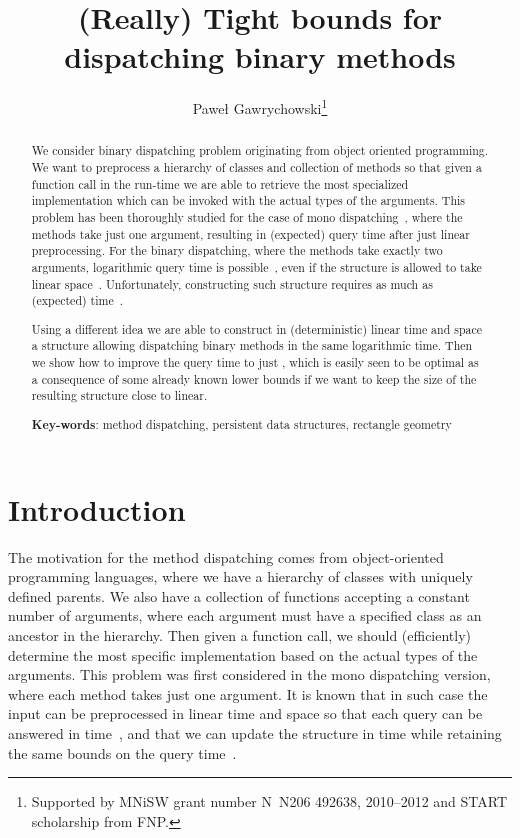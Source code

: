 \documentclass[runningheads]{llncs}
\begin{document}
\title{(Really) Tight bounds for dispatching binary methods}

\author{Pawe\l{} Gawrychowski\thanks{Supported by MNiSW grant number N~N206 492638, 2010--2012 and START scholarship from FNP.}}

\maketitle
\begin{abstract}
We consider binary dispatching problem originating from object oriented programming. We want to preprocess a hierarchy of classes and collection of methods so that given a function call in the run-time we are able to retrieve the most specialized implementation which can be invoked with the actual types of the arguments. This problem has been thoroughly studied for the case of mono dispatching~\cite{Muthukrishnan,FerraginaDynamic}, where the methods take just one argument, resulting in (expected)  query time after just linear preprocessing. For the binary dispatching, where the methods take exactly two arguments, logarithmic query time is possible~\cite{Ferragina}, even if the structure is allowed to take linear space~\cite{Alstrup}. Unfortunately, constructing such structure requires as much as (expected)  time~\cite{Alstrup,Poon}.

Using a different idea we are able to construct in (deterministic) linear time and space a structure allowing dispatching binary methods in the same logarithmic time. Then we show how to improve the query time to just , which is easily seen to be optimal as a consequence of some already known lower bounds if we want to keep the size of the resulting structure close to linear.

\textbf{Key-words}: method dispatching, persistent data structures, rectangle geometry
\end{abstract}

\section{Introduction}

The motivation for the method dispatching comes from object-oriented programming languages, where we have a hierarchy of classes with uniquely defined parents. We also have a collection of  functions accepting a constant number of arguments, where each argument must have a specified class as an ancestor in the hierarchy. Then given a function call, we should (efficiently) determine the most specific implementation based on the actual types of the arguments. This problem was first considered in the mono dispatching version, where each method takes just one argument. It is known that in such case the input can be preprocessed in linear time and space so that each query can be answered in  time~\cite{Muthukrishnan}, and that we can update the structure in  time while retaining the same bounds on the query time~\cite{Ferragina}.
\end{document}
